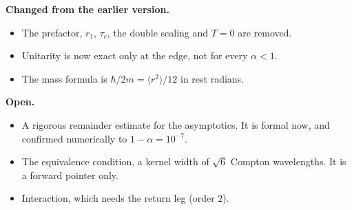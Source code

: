 \documentclass[10pt]{article}
\begin{document}
\medskip
\textbf{Changed from the earlier version.}
\begin{itemize}\setlength{\itemsep}{0pt}
\item The prefactor, $r_1$, $\tau_c$, the double scaling and $T=0$ are removed.
\item Unitarity is now exact only at the edge, not for every $\alpha<1$.
\item The mass formula is $\hbar/2m=\langle r^2\rangle/12$ in rest radians.
\end{itemize}

\textbf{Open.}
\begin{itemize}\setlength{\itemsep}{0pt}
\item A rigorous remainder estimate for the asymptotics. It is formal now, and confirmed numerically to $1-\alpha=10^{-7}$.
\item The equivalence condition, a kernel width of $\sqrt6$ Compton wavelengths. It is a forward pointer only.
\item Interaction, which needs the return leg (order $2$).
\end{itemize}
\end{document}
